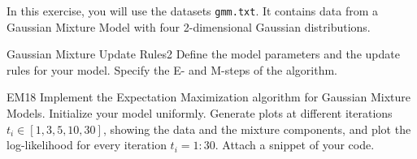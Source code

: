 \newif\ifvimbug
\vimbugfalse

\ifvimbug

\fi

 
In this exercise, you will use the datasets \texttt{gmm.txt}. It contains data from a Gaussian Mixture Model with four 2-dimensional Gaussian distributions.

\begin{questions}


\begin{question}{Gaussian Mixture Update Rules}{2}
Define the model parameters and the update rules for your model. 
Specify the E- and M-steps of the algorithm.

\begin{answer}\end{answer}

\end{question}


\begin{question}{EM}{18}
Implement the Expectation Maximization algorithm for Gaussian Mixture Models. Initialize your model uniformly. Generate plots at different iterations $t_i \in [1,3,5,10,30]$, showing the data and the mixture components, and plot the log-likelihood for every iteration $t_i=1:30$. Attach a snippet of your code.

\begin{answer}\end{answer}

\end{question}

\end{questions}
